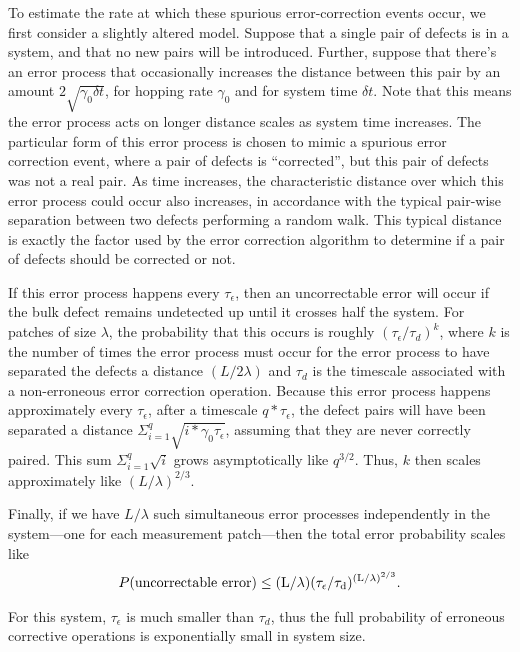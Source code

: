 \documentclass[twocolumn,superscriptaddress,aps,prb,floatfix]{revtex4-1}
\begin{document}
 To estimate the rate at which these spurious error-correction events occur, we first consider a slightly altered model.  Suppose that a single pair of defects is in a system, and that no new pairs will be introduced.  Further, suppose that there's an error process that occasionally increases the distance between this pair by an amount $2\sqrt{\gamma_0 \delta t}$, for hopping rate $\gamma_0$ and for system time $\delta t$.  Note that this means the error process acts on longer distance scales as system time increases.  The particular form of this error process is chosen to mimic a spurious error correction event, where a pair of defects is ``corrected'', but this pair of defects was not a real pair.  As time increases, the characteristic distance over which this error process could occur also increases, in accordance with the typical pair-wise separation between two defects performing a random walk.  This typical distance is exactly the factor used by the error correction algorithm to determine if a pair of defects should be corrected or not.

 If this error process happens every $\tau_{\epsilon}$, then an uncorrectable error will occur if the bulk defect remains undetected up until it crosses half the system.  For patches of size $\lambda$, the probability that this occurs is roughly $(\tau_{\epsilon} / \tau_d)^{k}$, where $k$ is the number of times the error process must occur for the error process to have separated the defects a distance $(L/2\lambda)$ and $\tau_d$ is the timescale associated with a non-erroneous error correction operation.  Because this error process happens approximately every $\tau_{\epsilon}$, after a timescale $q*\tau_{\epsilon}$, the defect pairs will have been separated a distance $\Sigma^q_{i=1} \sqrt{i * \gamma_0 \tau_{\epsilon}}$, assuming that they are never correctly paired.  This sum $\Sigma^q_{i=1} \sqrt{i}$ grows asymptotically like $q^{3/2}$.  Thus, $k$ then scales approximately like $(L/\lambda)^{2/3}$.
 
 Finally, if we have $L/\lambda$ such simultaneous error processes independently in the system---one for each measurement patch---then the total error probability scales like
\begin{align}
\label{eq:err_scaling}
 P(\rm{uncorrectable\ error}) \leq (L/\lambda) (\tau_{\epsilon} / \tau_d)^{(L/\lambda)^{2/3}}.
\end{align}

For this system, $\tau_{\epsilon}$ is much smaller than $\tau_d$, thus the full probability of erroneous corrective operations is exponentially small in system size.
 
\end{document}
